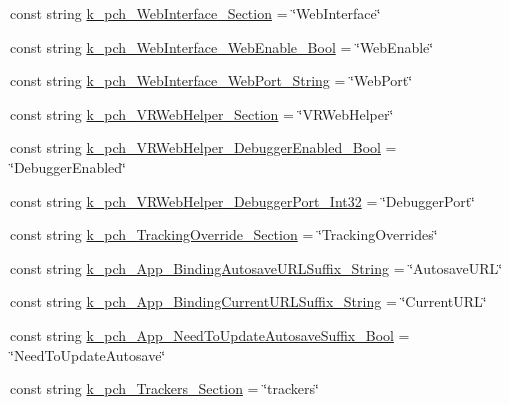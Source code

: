 \begin{DoxyCompactItemize}
\item 
const string \mbox{\hyperlink{class_valve_1_1_v_r_1_1_open_v_r_ab240832b62b6d04a0320880017314dfa}{k\+\_\+pch\+\_\+\+Web\+Interface\+\_\+\+Section}} = \char`\"{}Web\+Interface\char`\"{}
\item 
const string \mbox{\hyperlink{class_valve_1_1_v_r_1_1_open_v_r_a1f7d5db4b003f553b450fab6ba30afe4}{k\+\_\+pch\+\_\+\+Web\+Interface\+\_\+\+Web\+Enable\+\_\+\+Bool}} = \char`\"{}Web\+Enable\char`\"{}
\item 
const string \mbox{\hyperlink{class_valve_1_1_v_r_1_1_open_v_r_a0cdf668ba1f61335b9d45172cce8ce1f}{k\+\_\+pch\+\_\+\+Web\+Interface\+\_\+\+Web\+Port\+\_\+\+String}} = \char`\"{}Web\+Port\char`\"{}
\item 
const string \mbox{\hyperlink{class_valve_1_1_v_r_1_1_open_v_r_a5cba669db751a20c56359df271fedcb8}{k\+\_\+pch\+\_\+\+V\+R\+Web\+Helper\+\_\+\+Section}} = \char`\"{}V\+R\+Web\+Helper\char`\"{}
\item 
const string \mbox{\hyperlink{class_valve_1_1_v_r_1_1_open_v_r_a47f6954afb0ad13b1ad0e35c2fde3b0d}{k\+\_\+pch\+\_\+\+V\+R\+Web\+Helper\+\_\+\+Debugger\+Enabled\+\_\+\+Bool}} = \char`\"{}Debugger\+Enabled\char`\"{}
\item 
const string \mbox{\hyperlink{class_valve_1_1_v_r_1_1_open_v_r_a48c9e1472b730a2ff6752bb7a505b680}{k\+\_\+pch\+\_\+\+V\+R\+Web\+Helper\+\_\+\+Debugger\+Port\+\_\+\+Int32}} = \char`\"{}Debugger\+Port\char`\"{}
\item 
const string \mbox{\hyperlink{class_valve_1_1_v_r_1_1_open_v_r_a360d72558d73c51b5439501eb900b63e}{k\+\_\+pch\+\_\+\+Tracking\+Override\+\_\+\+Section}} = \char`\"{}Tracking\+Overrides\char`\"{}
\item 
const string \mbox{\hyperlink{class_valve_1_1_v_r_1_1_open_v_r_a6f3ce2652686fbb050467c54d1448074}{k\+\_\+pch\+\_\+\+App\+\_\+\+Binding\+Autosave\+U\+R\+L\+Suffix\+\_\+\+String}} = \char`\"{}Autosave\+U\+RL\char`\"{}
\item 
const string \mbox{\hyperlink{class_valve_1_1_v_r_1_1_open_v_r_a6a7933ae57cb06ab53e1b1b3b4877ed3}{k\+\_\+pch\+\_\+\+App\+\_\+\+Binding\+Current\+U\+R\+L\+Suffix\+\_\+\+String}} = \char`\"{}Current\+U\+RL\char`\"{}
\item 
const string \mbox{\hyperlink{class_valve_1_1_v_r_1_1_open_v_r_aa1f15bd6f7ae74394497dd5f7055bb6d}{k\+\_\+pch\+\_\+\+App\+\_\+\+Need\+To\+Update\+Autosave\+Suffix\+\_\+\+Bool}} = \char`\"{}Need\+To\+Update\+Autosave\char`\"{}
\item 
const string \mbox{\hyperlink{class_valve_1_1_v_r_1_1_open_v_r_adaf10877787fcaf426debc9e6ea70723}{k\+\_\+pch\+\_\+\+Trackers\+\_\+\+Section}} = \char`\"{}trackers\char`\"{}

\end{DoxyCompactItemize}
